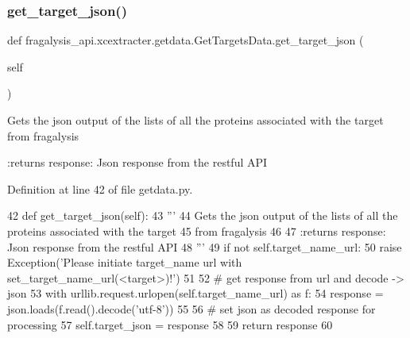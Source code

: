 \subsubsection{\texorpdfstring{get\+\_\+target\+\_\+json()}{get\_target\_json()}}
{\footnotesize\ttfamily def fragalysis\+\_\+api.\+xcextracter.\+getdata.\+Get\+Targets\+Data.\+get\+\_\+target\+\_\+json (\begin{DoxyParamCaption}\item[{}]{self }\end{DoxyParamCaption})}

\begin{DoxyVerb}Gets the json output of the lists of all the proteins associated with the target
from fragalysis

:returns response: Json response from the restful API
\end{DoxyVerb}
 

Definition at line 42 of file getdata.\+py.


\begin{DoxyCode}
42     \textcolor{keyword}{def }get\_target\_json(self):
43         \textcolor{stringliteral}{'''}
44 \textcolor{stringliteral}{        Gets the json output of the lists of all the proteins associated with the target}
45 \textcolor{stringliteral}{        from fragalysis}
46 \textcolor{stringliteral}{}
47 \textcolor{stringliteral}{        :returns response: Json response from the restful API}
48 \textcolor{stringliteral}{        '''}
49         \textcolor{keywordflow}{if} \textcolor{keywordflow}{not} self.target\_name\_url:
50             \textcolor{keywordflow}{raise} Exception(\textcolor{stringliteral}{'Please initiate target\_name url with set\_target\_name\_url(<target>)!'})
51 
52         \textcolor{comment}{# get response from url and decode -> json}
53         with urllib.request.urlopen(self.target\_name\_url) \textcolor{keyword}{as} f:
54             response = json.loads(f.read().decode(\textcolor{stringliteral}{'utf-8'}))
55 
56         \textcolor{comment}{# set json as decoded response for processing}
57         self.target\_json = response
58 
59         \textcolor{keywordflow}{return} response
60 
\end{DoxyCode}
\mbox{\label{classfragalysis__api_1_1xcextracter_1_1getdata_1_1_get_targets_data_abf5179a2489b7edaa16dc6bc8c89f051}} 
